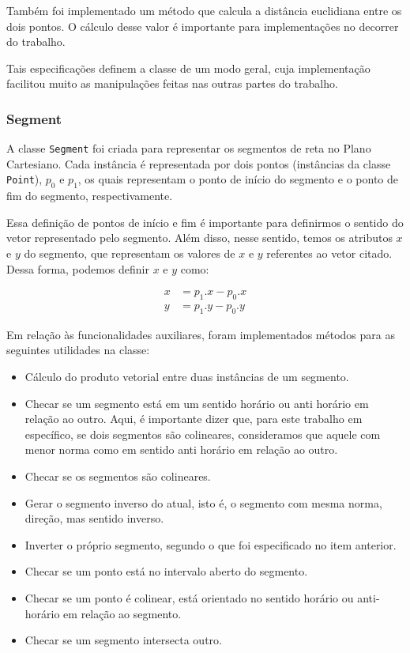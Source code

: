 \documentclass{article}
\begin{document}
Também foi implementado um método que calcula a distância euclidiana entre os dois pontos. O cálculo desse valor é importante para implementações no decorrer do trabalho.

Tais especificações definem a classe de um modo geral, cuja implementação facilitou muito as manipulações feitas nas outras partes do trabalho.

\subsubsection{Segment}

A classe \texttt{Segment} foi criada para representar os segmentos de reta no Plano Cartesiano. Cada instância é representada por dois pontos (instâncias da classe \texttt{Point}), \( p_0 \) e \( p_1 \), os quais representam o ponto de início do segmento e o ponto de fim do segmento, respectivamente.

Essa definição de pontos de início e fim é importante para definirmos o sentido do vetor representado pelo segmento. Além disso, nesse sentido, temos os atributos \( x \) e \( y \) do segmento, que representam os valores de \( x \) e \( y \) referentes ao vetor citado. Dessa forma, podemos definir \( x \) e \( y \) como:

\begin{align*}
	x & = p_1.x - p_0.x \\
	y & = p_1.y - p_0.y
\end{align*}

Em relação às funcionalidades auxiliares, foram implementados métodos para as seguintes utilidades na classe:

\begin{itemize}
	\item Cálculo do produto vetorial entre duas instâncias de um segmento.
	\item Checar se um segmento está em um sentido horário ou anti horário em relação ao outro. Aqui, é importante dizer que, para este trabalho em específico, se dois segmentos são colineares, consideramos que aquele com menor norma como em sentido anti horário em relação ao outro.
	\item Checar se os segmentos são colineares.
	\item Gerar o segmento inverso do atual, isto é, o segmento com mesma norma, direção, mas sentido inverso.
	\item Inverter o próprio segmento, segundo o que foi especificado no item anterior.
	\item Checar se um ponto está no intervalo aberto do segmento.
	\item Checar se um ponto é colinear, está orientado no sentido horário ou anti-horário em relação ao segmento.
	\item Checar se um segmento intersecta outro.
\end{itemize}
\end{document}
